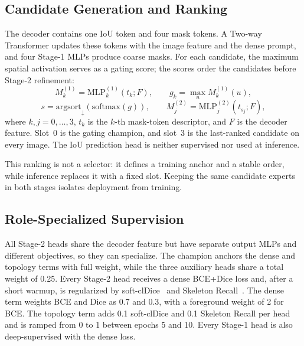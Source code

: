 \subsection{Candidate Generation and Ranking}
\label{sec:method_candidates}

The decoder contains one IoU token and four mask tokens. A Two-way Transformer
updates these tokens with the image feature and the dense prompt, and four
Stage-1 MLPs produce coarse masks. For each candidate, the maximum spatial
activation serves as a gating score; the scores order the candidates before
Stage-2 refinement:
\begin{equation}
M_k^{(1)}=\mathrm{MLP}_k^{(1)}(t_k;F),\qquad
g_k=\max_{u}M_k^{(1)}(u),
\label{eq:stage1}
\end{equation}
\begin{equation}
s=\mathrm{argsort}_{\downarrow}\!\left(\mathrm{softmax}(g)\right),\qquad
M_j^{(2)}=\mathrm{MLP}_j^{(2)}(t_{s_j};F),
\label{eq:stage2}
\end{equation}
where $k,j=0,\dots,3$, $t_k$ is the $k$-th mask-token descriptor, and $F$ is
the decoder feature. Slot~0 is the gating champion, and slot~3 is the
last-ranked candidate on every image. The IoU prediction head is neither
supervised nor used at inference.

This ranking is not a selector: it defines a training anchor and a stable
order, while inference replaces it with a fixed slot. Keeping the same
candidate experts in both stages isolates deployment from training.

\subsection{Role-Specialized Supervision}
\label{sec:method_supervision}

All Stage-2 heads share the decoder feature but have separate output MLPs and
different objectives, so they can specialize. The champion anchors the dense
and topology terms with full weight, while the three auxiliary heads share a
total weight of 0.25. Every Stage-2 head receives a dense BCE+Dice loss and,
after a short warmup, is regularized by soft-clDice~\cite{shit2021cldice} and
Skeleton Recall~\cite{kirchhoff2024skeletonrecall}. The dense term weights BCE
and Dice as $0.7$ and $0.3$, with a foreground weight of 2 for BCE. The
topology term adds 0.1 soft-clDice and 0.1 Skeleton Recall per head and is
ramped from 0 to 1 between epochs 5 and 10. Every Stage-1 head is also
deep-supervised with the dense loss.

